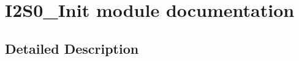 \hypertarget{group___i2_s0___init__module}{}\section{I2\+S0\+\_\+\+Init module documentation}
\label{group___i2_s0___init__module}


\subsection{Detailed Description}
